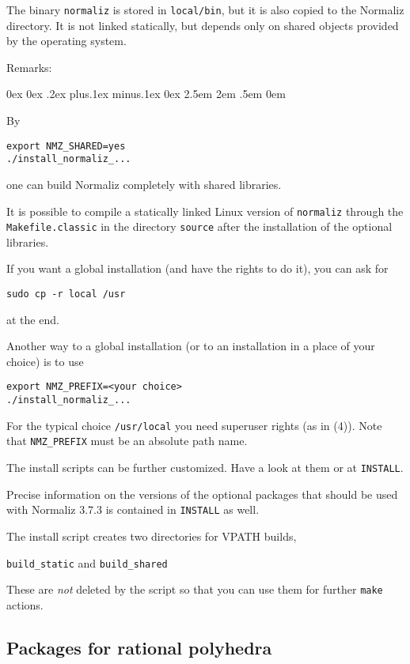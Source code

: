 \documentclass[12pt,a4paper]{scrartcl}
\newcounter{listi}
\newcommand{\stdli}{ \topsep0ex \partopsep0ex %
\parsep.2ex plus.1ex minus.1ex \itemsep0ex%
\leftmargin2.5em \labelwidth2em \labelsep.5em \rightmargin0em}%
\newenvironment{arab}{\begin{list}{\textup{(\arabic{listi})}}%
	{\usecounter{listi}\stdli}}{\end{list}}
\theoremstyle{definition}
\def\ttt{\texttt}
\def\version{3.7.3}
\begin{document}
The binary \verb|normaliz| is stored in \verb|local/bin|, but it is also copied to the Normaliz directory. It is not linked statically, but depends only on shared objects provided by the operating system. 

Remarks:
\begin{arab}
\item By
\begin{Verbatim}
export NMZ_SHARED=yes  
./install_normaliz_...
\end{Verbatim}
one can build Normaliz completely with shared libraries.
\item It is possible to compile a statically linked Linux version of  \verb|normaliz|  through the \verb|Makefile.classic| in the directory \verb|source| after the installation of the optional libraries.

\item If you want a global installation (and have the rights to do it), you can ask for
\begin{Verbatim}
sudo cp -r local /usr
\end{Verbatim}
at the end.

\item Another way to a global installation (or to an installation in a place of your choice) is to use
\begin{Verbatim}
export NMZ_PREFIX=<your choice>  
./install_normaliz_...
\end{Verbatim}

For the typical choice \verb|/usr/local| you need superuser rights (as in (4)). Note that \verb|NMZ_PREFIX| must be an absolute path name.

\item The install scripts can be further customized. Have a look at them or at \verb|INSTALL|.

\item Precise information on the versions of the optional packages that should be used with Normaliz \version{} is contained in \verb|INSTALL| as well.

\item The install script creates two directories for VPATH builds,
\begin{center}
\ttt{build\_static} \qquad and \qquad \ttt{build\_shared}
\end{center}
These are \emph{not} deleted by the script so that you can use them for further \ttt{make} actions.
\end{arab}

\subsection{Packages for rational polyhedra}
\end{document}
